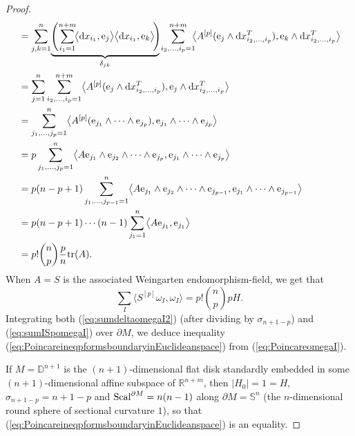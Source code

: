 \begin{proof}
\begin{align}
&= \sum_{j,k=1}^n\!\underbrace{\left(\sum_{i_1=1}^{n+m}\!\bigl\langle {\rm d}x_{i_1},{\rm e}_j\bigr\rangle\bigl\langle {\rm d}x_{i_1},{\rm e}_k\bigr\rangle\!\right)\!}_{\delta_{jk}}\sum_{i_2,\dots,i_p=1}^{n+m}\!\!\bigl\langle A^{[p]}({\rm e}_j\wedge {\rm d}x_{i_2,\dots,i_p}^T),{\rm e}_k\wedge {\rm d}x_{i_2,\dots,i_p}^T\bigr\rangle\nonumber\\
&= \sum_{j=1}^n\sum_{i_2,\dots,i_p=1}^{n+m}\bigl\langle A^{[p]}({\rm e}_j\wedge {\rm d}x_{i_2,\dots,i_p}^T),{\rm e}_j\wedge {\rm d}x_{i_2,\dots,i_p}^T\bigr\rangle\nonumber\\
&= \sum_{j_1,\dots,j_p=1}^n\bigl\langle A^{[p]}({\rm e}_{j_1}\wedge\dots\wedge {\rm e}_{j_p}),{\rm e}_{j_1}\wedge\dots\wedge {\rm e}_{j_p}\bigr\rangle\nonumber\\
&= p\sum_{j_1,\dots,j_p=1}^n\bigl\langle A{\rm e}_{j_1}\wedge {\rm e}_{j_2}\wedge\dots\wedge {\rm e}_{j_p},{\rm e}_{j_1}\wedge\dots\wedge {\rm e}_{j_p}\bigr\rangle\nonumber\\
&= p(n-p+1)\sum_{j_1,\dots,j_{p-1}=1}^n\bigl\langle A{\rm e}_{j_1}\wedge {\rm e}_{j_2}\wedge\dots\wedge {\rm e}_{j_{p-1}},{\rm e}_{j_1}\wedge\dots\wedge {\rm e}_{j_{p-1}}\bigr\rangle\nonumber\\
&= p(n-p+1)\cdots(n-1)\sum_{j_1=1}^n\bigl\langle A{\rm e}_{j_1},{\rm e}_{j_1}\bigr\rangle\nonumber\\
&= p!\binom{n}{p}\frac{p}{n}{\rm tr}(A).\label{eq:traceap}
\end{align}
When $A=S$ is the associated Weingarten endomorphism-field, we get that
\begin{equation}\label{eq:sumISpomegaI}
\sum_I\bigl\langle S^{[p]}\omega_I,\omega_I\bigr\rangle=p!\binom{n}{p}pH.
\end{equation}
Integrating both (\ref{eq:sumdeltaomegaI2}) (after dividing by $\sigma_{n+1-p}$) and (\ref{eq:sumISpomegaI}) over $\partial M$, we deduce i\-ne\-qua\-li\-ty (\ref{eq:PoincareineqpformsboundaryinEuclideanspace}) from (\ref{eq:PoincareomegaI}).

If $M=\mathbb{D}^{n+1}$ is the $(n+1)$-dimensional flat disk standardly embedded in some $(n+1)$-dimensional affine subspace of $\mathbb{R}^{n+m}$, then $|H_0|=1=H$, $\sigma_{n+1-p}=n+1-p$ and  ${\rm Scal}^{\partial M}=n(n-1)$  along $\partial M=\mathbb{S}^n$ (the $n$-dimensional round sphere of sectional curvature $1$), so that (\ref{eq:PoincareineqpformsboundaryinEuclideanspace})  is an equality.


\end{proof}

